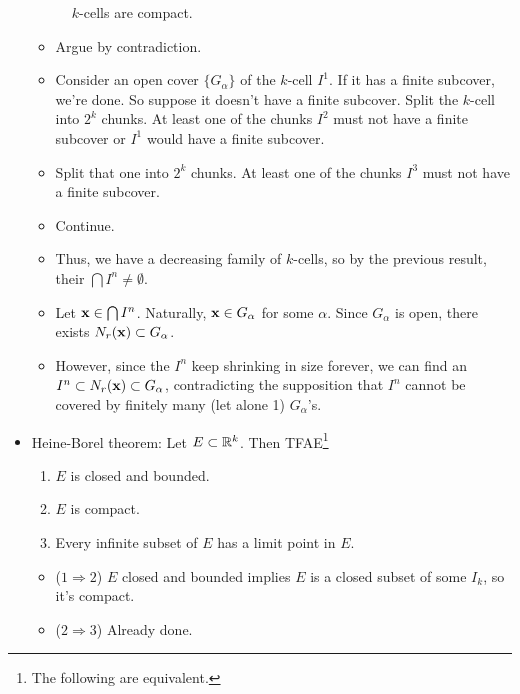 \documentclass[../../notes.tex]{subfiles}
\begin{document}
\begin{itemize}
\begin{figure}[h!]
        \caption{$k$-cells are compact.}
        \label{fig:kcellCompact}
    \end{figure}
    \begin{itemize}
        \item Argue by contradiction.
        \item Consider an open cover $\{G_\alpha\}$ of the $k$-cell $I^1$. If it has a finite subcover, we're done. So suppose it doesn't have a finite subcover. Split the $k$-cell into $2^k$ chunks. At least one of the chunks $I^2$ must not have a finite subcover or $I^1$ would have a finite subcover.
        \item Split that one into $2^k$ chunks. At least one of the chunks $I^3$ must not have a finite subcover.
        \item Continue.
        \item Thus, we have a decreasing family of $k$-cells, so by the previous result, their $\bigcap I^n\neq\emptyset$.
        \item Let $\mathbf{x}\in\bigcap I^n$. Naturally, $\mathbf{x}\in G_\alpha$ for some $\alpha$. Since $G_\alpha$ is open, there exists $N_r(\mathbf{x})\subset G_\alpha$.
        \item However, since the $I^n$ keep shrinking in size forever, we can find an $I^n\subset N_r(\mathbf{x})\subset G_\alpha$, contradicting the supposition that $I^n$ cannot be covered by finitely many (let alone 1) $G_\alpha$'s.
    \end{itemize}
    \item Heine-Borel theorem: Let $E\subset\mathbb{R}^k$. Then TFAE\footnote{The following are equivalent.}
    \begin{enumerate}
        \item $E$ is closed and bounded.
        \item $E$ is compact.
        \item Every infinite subset of $E$ has a limit point in $E$.
    \end{enumerate}
    \begin{itemize}
        \item ($1\Rightarrow 2$) $E$ closed and bounded implies $E$ is a closed subset of some $I_k$, so it's compact.
        \item ($2\Rightarrow 3$) Already done.

\end{itemize}
\end{itemize}
\end{document}
